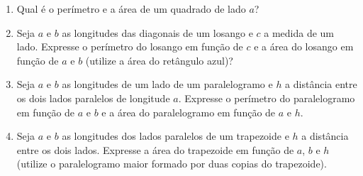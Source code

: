 \begin{enumerate}
\item
 Qual é o perímetro e a área de um quadrado de lado $a$?

\begin{center}
\end{center}

\item Seja $a$ e $b$ as longitudes das diagonais de um losango e $c$ a medida
  de um lado. Expresse o perímetro do losango em função de $c$ e
  a área do losango em função de $a$ e $b$ (utilize a área do retângulo azul)?
  
\begin{center}
\end{center}

\item Seja $a$ e $b$ as longitudes de um lado de um paralelogramo e $h$ a
  distância entre os dois lados paralelos de longitude $a$.
  Expresse o perímetro do paralelogramo em função de $a$ e $b$ e
  a área do paralelogramo em função de $a$ e $h$.

\begin{center}
\end{center}

\item Seja $a$ e $b$ as longitudes dos lados paralelos de um trapezoide e $h$ a
  distância entre os dois lados.
  Expresse a área do trapezoide em função de $a$, $b$ e $h$ (utilize o
  paralelogramo maior formado por duas copias do trapezoide).


\end{enumerate}
